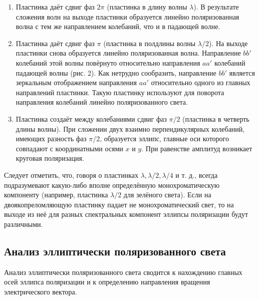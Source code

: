 \begin{enumerate}

\item Пластинка даёт сдвиг фаз $ 2\pi $ (пластинка в длину волны $ \lambda $). В
результате сложения волн на выходе пластинки образуется линейно поляризованная волна
с тем же направлением колебаний, что и в падающей волне. \\

\item Пластинка даёт сдвиг фаз $ \pi $ (пластинка в полдлины волны $ \lambda / 2 $).
На выходе пластинки снова образуется линейно поляризованная волна. Направление $ bb' $
колебаний этой волны повёрнуто относительно направления $ aa' $ колебаний падающей волны
(рис. 2). Как нетрудно сообразить, направление $ bb' $ является зеркальным отображением
направления $ aa' $ относительно одного из главных направлений пластинки. Такую пластинку
используют для поворота направления колебаний линейно поляризованного света. \\


\item Пластинка создаёт между колебаниями сдвиг фаз $ \pi/2 $ (пластинка в четверть длины
волны). При сложении двух взаимно перпендикулярных колебаний, имеющих разность фаз
$ \pi/2 $, образуется эллипс, главные оси которого совпадают с координатными осями
$ x $ и $ y $. При равенстве амплитуд возникает круговая поляризация.

\end{enumerate}

Следует отметить, что, говоря о пластинках $ \lambda , \lambda/2, \lambda/4  $ и т. д.,
всегда подразумевают какую-либо вполне определённую монохроматическую компоненту (например,
пластинка $ \lambda/2 $ для зелёного света). Если на двоякопреломляющую пластинку падает
не монохроматический свет, то на выходе из неё для разных спектральных компонент эллипсы
поляризации будут различными. \\

\subsection{Анализ эллиптически поляризованного света}

Анализ эллиптически поляризованного света сводится к нахождению главных осей эллипса
поляризации и к определению направления вращения электрического вектора. \\

